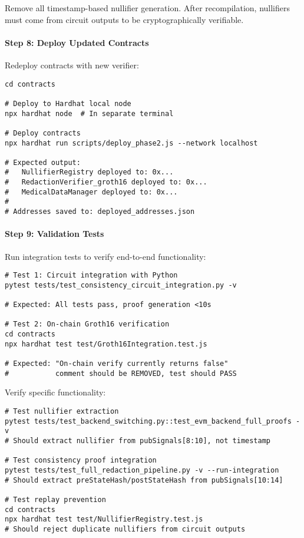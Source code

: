 Remove all timestamp-based nullifier generation. After recompilation, nullifiers must come from circuit outputs to be cryptographically verifiable.

\paragraph{Step 8: Deploy Updated Contracts}

Redeploy contracts with new verifier:

\begin{verbatim}
cd contracts

# Deploy to Hardhat local node
npx hardhat node  # In separate terminal

# Deploy contracts
npx hardhat run scripts/deploy_phase2.js --network localhost

# Expected output:
#   NullifierRegistry deployed to: 0x...
#   RedactionVerifier_groth16 deployed to: 0x...
#   MedicalDataManager deployed to: 0x...
#
# Addresses saved to: deployed_addresses.json
\end{verbatim}

\paragraph{Step 9: Validation Tests}

Run integration tests to verify end-to-end functionality:

\begin{verbatim}
# Test 1: Circuit integration with Python
pytest tests/test_consistency_circuit_integration.py -v

# Expected: All tests pass, proof generation <10s

# Test 2: On-chain Groth16 verification
cd contracts
npx hardhat test test/Groth16Integration.test.js

# Expected: "On-chain verify currently returns false" 
#           comment should be REMOVED, test should PASS
\end{verbatim}

Verify specific functionality:

\begin{verbatim}
# Test nullifier extraction
pytest tests/test_backend_switching.py::test_evm_backend_full_proofs -v
# Should extract nullifier from pubSignals[8:10], not timestamp

# Test consistency proof integration  
pytest tests/test_full_redaction_pipeline.py -v --run-integration
# Should extract preStateHash/postStateHash from pubSignals[10:14]

# Test replay prevention
cd contracts
npx hardhat test test/NullifierRegistry.test.js
# Should reject duplicate nullifiers from circuit outputs
\end{verbatim}

